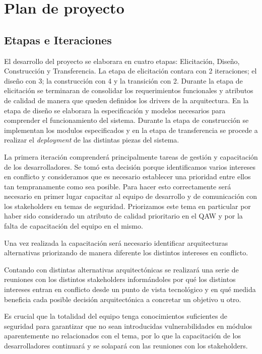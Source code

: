 \section{Plan de proyecto}

\subsection{Etapas e Iteraciones}

El desarrollo del proyecto se elaborara en cuatro etapas: Elicitación, Diseño, Construcción y Transferencia. La etapa de elicitación contara con 2 iteraciones; el diseño con 3; la construcción con 4 y la transición con 2. Durante la etapa de elicitación se terminaran de consolidar los requerimientos funcionales y atributos de calidad de manera que queden definidos los drivers de la arquitectura. En la etapa de diseño se elaborara la especificación y modelos necesarios para comprender el funcionamiento del sistema. Durante la etapa de construcción se implementan los modulos especificados y en la etapa de transferencia se procede a realizar el \textit{deployment} de las distintas piezas del sistema.  
\\ \par
La primera iteración comprenderá principalmente tareas de gestión y capacitación de los desarrolladores. Se tomó esta decisión porque identificamos varios intereses en conflicto y consideramos que es necesario establecer una prioridad entre ellos tan tempranamente como sea posible. Para hacer esto correctamente será necesario en primer lugar capacitar al equipo de desarrollo y de comunicación con los stakeholders en temas de seguridad. Priorizamos este tema en particular por haber sido considerado un atributo de calidad prioritario en el QAW y por la falta de capacitación del equipo en el mismo. 
\\ \par
Una vez realizada la capacitación será necesario identificar arquitecturas alternativas priorizando de manera diferente los distintos intereses en conflicto.
\\ \par
Contando con distintas alternativas arquitectónicas se realizará una serie de reuniones con los distintos stakeholders informándoles por qué los distintos intereses entran en conflicto desde un punto de vista tecnológico y en qué medida beneficia cada posible decisión arquitectónica a concretar un objetivo u otro.
\\ \par
Es crucial que la totalidad del equipo tenga conocimientos suficientes de seguridad para garantizar que no sean introducidas vulnerabilidades en módulos aparentemente no relacionados con el tema, por lo que la capacitación de los desarrolladores continuará y se solapará con las reuniones con los stakeholders. 

